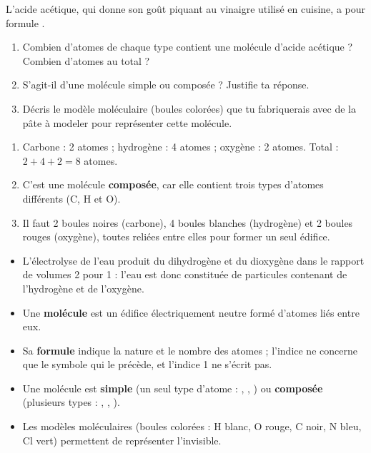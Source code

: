 \documentclass[11pt]{article}
\begin{document}
\begin{exercice}
L'acide acétique, qui donne son goût piquant au vinaigre utilisé en cuisine, a pour formule .
\begin{enumerate}
\item Combien d'atomes de chaque type contient une molécule d'acide acétique ? Combien d'atomes au total ?
\item S'agit-il d'une molécule simple ou composée ? Justifie ta réponse.
\item Décris le modèle moléculaire (boules colorées) que tu fabriquerais avec de la pâte à modeler pour représenter cette molécule.
\end{enumerate}
\end{exercice}

\begin{corrige}[Exercice 1]
\begin{enumerate}
\item Carbone : 2 atomes ; hydrogène : 4 atomes ; oxygène : 2 atomes. Total : $2 + 4 + 2 = 8$ atomes.
\item C'est une molécule \textbf{composée}, car elle contient trois types d'atomes différents (C, H et O).
\item Il faut 2 boules noires (carbone), 4 boules blanches (hydrogène) et 2 boules rouges (oxygène), toutes reliées entre elles pour former un seul édifice.
\end{enumerate}
\end{corrige}

\begin{aretenir}
\begin{itemize}
\item L'électrolyse de l'eau produit du dihydrogène et du dioxygène dans le rapport de volumes 2 pour 1 : l'eau est donc constituée de particules contenant de l'hydrogène et de l'oxygène.
\item Une \textbf{molécule} est un édifice électriquement neutre formé d'atomes liés entre eux.
\item Sa \textbf{formule} indique la nature et le nombre des atomes ; l'indice ne concerne que le symbole qui le précède, et l'indice 1 ne s'écrit pas.
\item Une molécule est \textbf{simple} (un seul type d'atome : , , ) ou \textbf{composée} (plusieurs types : , , ).
\item Les modèles moléculaires (boules colorées : H blanc, O rouge, C noir, N bleu, Cl vert) permettent de représenter l'invisible.
\end{itemize}
\end{aretenir}
\end{document}
